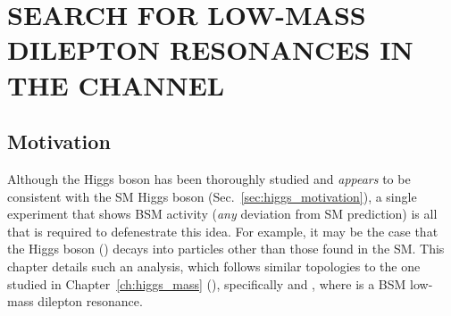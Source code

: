 \chapter{SEARCH FOR LOW-MASS DILEPTON RESONANCES IN THE \texorpdfstring{\htofourl}{H TO 4l} CHANNEL}
\label{ch:dilep_res}

\section{Motivation}
Although the Higgs boson has been thoroughly studied and \emph{appears} to be consistent with the SM Higgs boson (Sec.~\ref{sec:higgs_motivation}), a single experiment that shows BSM activity (\ie \emph{any} deviation from SM prediction) is all that is required to defenestrate this idea.
For example, it may be the case that the Higgs boson (\PH) decays into particles other than those found in the SM.
This chapter details such an analysis, which follows similar topologies to the one studied in Chapter~\ref{ch:higgs_mass} (\hzzfourl), specifically \hzxfourl and \hxxfourl, where \PX is a BSM low-mass dilepton resonance.